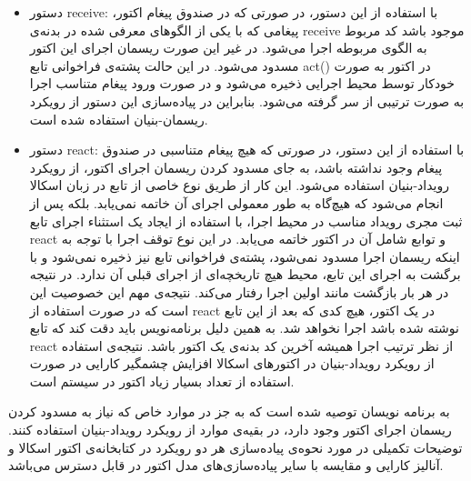 \begin{itemize}
\item دستور receive:
با استفاده از این دستور، در صورتی که در صندوق پیغام اکتور، پیغامی که با یکی از الگوهای معرفی شده در بدنه‌ی receive موجود باشد کد مربوط به الگوی‌ مربوطه اجرا می‌شود. در غیر این صورت ریسمان اجرای این اکتور مسدود می‌شود. در این حالت پشته‌ی فراخوانی تابع act() در اکتور به صورت خودکار توسط محیط اجرایی ذخیره می‌شود و در صورت ورود پیغام متناسب اجرا به صورت ترتیبی از سر گرفته می‌شود. بنابراین در پیاده‌سازی این دستور از رویکرد ریسمان-بنیان استفاده شده است.
\item دستور react:
با استفاده از این دستور، در صورتی که هیچ پیغام متناسبی در صندوق پیغام وجود نداشته باشد، به جای مسدود کردن ریسمان اجرای اکتور، از رویکرد رویداد-بنیان استفاده می‌شود. این کار از طریق نوع خاصی از تابع در زبان اسکالا انجام می‌شود که هیچ‌گاه به طور معمولی اجرای آن خاتمه نمی‌یابد. بلکه پس از ثبت مجری رویداد مناسب در محیط اجرا، با استفاده از ایجاد یک \gls{استثناء} اجرای تابع react و توابع شامل آن در اکتور خاتمه می‌یابد. در این نوع توقف اجرا با توجه به اینکه ریسمان اجرا مسدود نمی‌شود، پشته‌ی فراخوانی تابع نیز ذخیره نمی‌شود و با برگشت به اجرای این تابع، محیط هیچ تاریخچه‌ای از اجرای قبلی آن ندارد. در نتیجه در هر بار بازگشت مانند اولین اجرا رفتار می‌کند. نتیجه‌ی مهم این خصوصیت این است که در صورت استفاده از react در یک اکتور، هیچ کدی که بعد از این تابع نوشته شده باشد اجرا نخواهد شد. به همین دلیل برنامه‌نویس باید دقت کند که تابع react از نظر ترتیب اجرا همیشه آخرین کد بدنه‌ی یک اکتور باشد.
نتیجه‌ی استفاده از رویکرد رویداد-بنیان در اکتور‌های اسکالا افزایش چشمگیر کارایی در صورت استفاده از تعداد بسیار زیاد اکتور در سیستم است. 
\end{itemize}
به برنامه نویسان توصیه شده است که به جز در موارد خاص که نیاز به مسدود کردن ریسمان اجرای اکتور وجود دارد، در بقیه‌ی موارد از رویکرد رویداد-بنیان استفاده کنند. توضیحات تکمیلی در مورد نحوه‌ی پیاده‌سازی هر دو رویکرد در کتابخانه‌ی اکتور اسکالا و آنالیز کارایی و مقایسه با سایر پیاده‌سازی‌های مدل اکتور در  \cite{Haller2009202} قابل دسترس می‌باشد.

